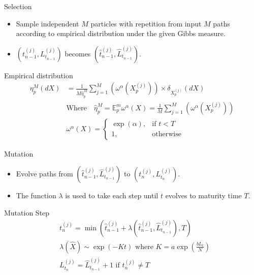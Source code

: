 \begin{frame}{Selection}
	\begin{itemize}
		\item Sample independent $M$ particles with repetition from input $M$ paths according to empirical distribution under the given Gibbs measure.
		\item $\left(t^{(j)}_{n-1}, L_{t_{n-1}}^{(j)} \right)$ becomes $\left( \hat{t}_{n-1}^{(j)}, \hat{L}_{t_{n-1}}^{(j)}\right)$.
	\end{itemize}
	\begin{block}{Empirical distribution}
		\begin{equation*}
			\begin{split}
				\eta_{p}^{M}(dX) &= \frac{1}{M \hat{\eta}_{p}^{M}}\sum_{j=1}^{M}\left(\omega^{\alpha}(X_{p}^{(j)})\right) \times \delta_{{X}_p^{(j)}}(dX) \\
				&\text{Where} \quad
				\hat{\eta}_{p}^{M} = \mathbb{E}_{p}^{m}\omega^{\alpha}(X) =
				\frac{1}{M}\sum_{j=1}^{M}\left(\omega^{\alpha}(X_{p}^{(j)})\right)\\
				&\omega^{\alpha}(X)= 
                		\begin{cases}
    						\exp(\alpha),& \text{if } t < T\\
    						1,              & \text{otherwise}
						 \end{cases}
		    \end{split}
		\end{equation*}
	\end{block}
\end{frame}

\begin{frame}{Mutation}
	\begin{itemize}
		\item Evolve paths from $\left( \hat{t}_{n-1}^{(j)}, \hat{L}_{t_{n-1}}^{(j)}\right)$ to $\left(t^{(j)}_{n}, L_{t_{n}}^{(j)} \right)$.
		\item The function $\lambda$ is used to take each step until $t$ evolves to maturity time $T$. 
	\end{itemize}
	\begin{block}{Mutation Step}
		\begin{equation*}
				\begin{split}
					&t^{(j)}_{n}= \min\left(\hat{t}^{(j)}_{n-1} + \lambda\left(\hat{t}^{(j)}_{n-1},\hat{L}_{t_{n-1}}^{(j)}\right),T\right) \\
					& \lambda\left(\hat{X}\right) \sim \exp(-Kt) \text{ where }K = a\exp\left(\frac{bL_{t}}{N}\right) \\
					&L_{t_{n}}^{(j)} = \hat{L}_{t_{n-1}}^{(j)} + 1 \text{ if } t^{(j)}_{n} 		\neq T					
				\end{split}	
		\end{equation*}
	\end{block}
\end{frame}

